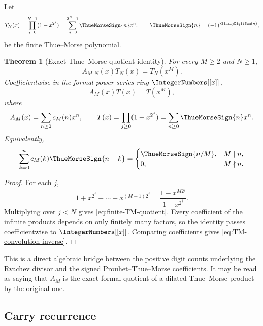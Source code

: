 \documentclass[11pt,oneside]{article}
\newtheorem{theorem}{Theorem}[section]
\theoremstyle{definition}
\theoremstyle{remark}
\begin{document}
Let
\begin{equation}
 T_N(x)=\prod_{j=0}^{N-1}(1-x^{2^j})
 =\sum_{n=0}^{2^N-1}\ThueMorseSign{n}x^n,
 \qquad
 \ThueMorseSign{n}=(-1)^{\BinaryDigitSum(n)},
 \label{eq:TN}
\end{equation}
be the finite Thue--Morse polynomial.

\begin{theorem}[Exact Thue--Morse quotient identity]
\label{thm:TM-quotient}
For every $M\ge2$ and $N\ge1$,
\begin{equation}
 \boxed{A_{M,N}(x)T_N(x)=T_N(x^M).}
 \label{eq:finite-TM-quotient}
\end{equation}
Coefficientwise in the formal power-series ring $\IntegerNumbers[[x]]$,
\begin{equation}
 A_M(x)T(x)=T(x^M),
 \label{eq:infinite-TM-quotient}
\end{equation}
where
\begin{equation}
 A_M(x)=\sum_{n\ge0}c_M(n)x^n,
 \qquad
 T(x)=\prod_{j\ge0}(1-x^{2^j})=\sum_{n\ge0}\ThueMorseSign{n}x^n.
 \label{eq:AM-T}
\end{equation}
Equivalently,
\begin{equation}
 \sum_{k=0}^{n}c_M(k)\ThueMorseSign{n-k}
 =\begin{cases}
 \ThueMorseSign{n/M},&M\mid n,\\
 0,&M\nmid n.
 \end{cases}
 \label{eq:TM-convolution-inverse}
\end{equation}
\end{theorem}

\begin{proof}
For each $j$,
\[
 1+x^{2^j}+\cdots+x^{(M-1)2^j}
 =\frac{1-x^{M2^j}}{1-x^{2^j}}.
\]
Multiplying over $j<N$ gives \eqref{eq:finite-TM-quotient}.  Every coefficient of the
infinite products depends on only finitely many factors, so the identity passes
coefficientwise to $\IntegerNumbers[[x]]$.  Comparing coefficients gives \eqref{eq:TM-convolution-inverse}.
\end{proof}

This is a direct algebraic bridge between the positive digit counts underlying the Rvachev
divisor and the signed Prouhet--Thue--Morse coefficients.  It may be read as saying that
$A_M$ is the exact formal quotient of a dilated Thue--Morse product by the original one.

\subsection{Carry recurrence}
\end{document}
